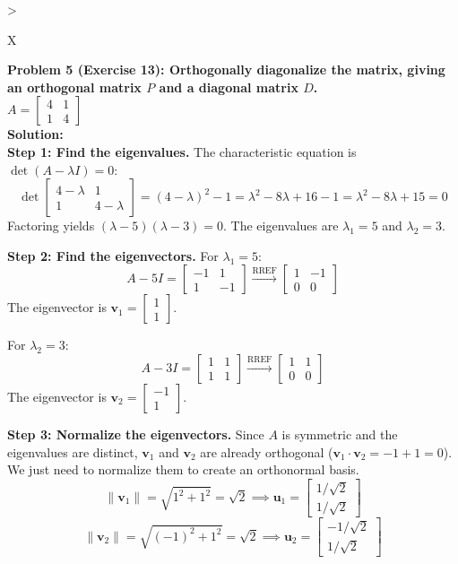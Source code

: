 \documentclass[11pt, letterpaper]{article}
\theoremstyle{definition}
\theoremstyle{remark}
\begin{document}
\begin{tabularx}{\textwidth}{>{\raggedright\arraybackslash}X}
\toprule
\textbf{Problem 5 (Exercise 13): Orthogonally diagonalize the matrix, giving an orthogonal matrix $P$ and a diagonal matrix $D$.} \\
$A = \begin{bmatrix} 4 & 1 \\ 1 & 4 \end{bmatrix}$ \\
\midrule
\textbf{Solution:} \\
\textbf{Step 1: Find the eigenvalues.}
The characteristic equation is $\det(A - \lambda I) = 0$:
\[ \det \begin{bmatrix} 4-\lambda & 1 \\ 1 & 4-\lambda \end{bmatrix} = (4-\lambda)^2 - 1 = \lambda^2 - 8\lambda + 16 - 1 = \lambda^2 - 8\lambda + 15 = 0 \]
Factoring yields $(\lambda - 5)(\lambda - 3) = 0$. The eigenvalues are $\lambda_1 = 5$ and $\lambda_2 = 3$.

\textbf{Step 2: Find the eigenvectors.}
For $\lambda_1 = 5$:
\[ A - 5I = \begin{bmatrix} -1 & 1 \\ 1 & -1 \end{bmatrix} \xrightarrow{\text{RREF}} \begin{bmatrix} 1 & -1 \\ 0 & 0 \end{bmatrix} \]
The eigenvector is $\mathbf{v}_1 = \begin{bmatrix} 1 \\ 1 \end{bmatrix}$.

For $\lambda_2 = 3$:
\[ A - 3I = \begin{bmatrix} 1 & 1 \\ 1 & 1 \end{bmatrix} \xrightarrow{\text{RREF}} \begin{bmatrix} 1 & 1 \\ 0 & 0 \end{bmatrix} \]
The eigenvector is $\mathbf{v}_2 = \begin{bmatrix} -1 \\ 1 \end{bmatrix}$.

\textbf{Step 3: Normalize the eigenvectors.}
Since $A$ is symmetric and the eigenvalues are distinct, $\mathbf{v}_1$ and $\mathbf{v}_2$ are already orthogonal ($\mathbf{v}_1 \cdot \mathbf{v}_2 = -1 + 1 = 0$). We just need to normalize them to create an orthonormal basis.
\[ \|\mathbf{v}_1\| = \sqrt{1^2 + 1^2} = \sqrt{2} \implies \mathbf{u}_1 = \begin{bmatrix} 1/\sqrt{2} \\ 1/\sqrt{2} \end{bmatrix} \]
\[ \|\mathbf{v}_2\| = \sqrt{(-1)^2 + 1^2} = \sqrt{2} \implies \mathbf{u}_2 = \begin{bmatrix} -1/\sqrt{2} \\ 1/\sqrt{2} \end{bmatrix} \]


\end{tabularx}
\end{document}
